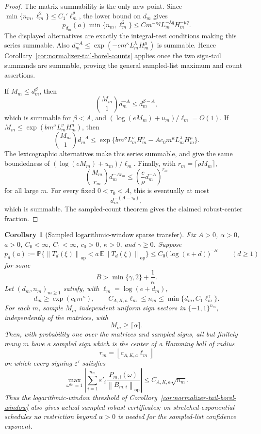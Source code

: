 \documentclass[11pt]{amsart}
\numberwithin{equation}{section}
\newtheorem{corollary}[theorem]{Corollary}
\theoremstyle{definition}
\theoremstyle{remark}
\newcommand{\op}{\mathrm{op}}
\newcommand{\Prob}{\mathbb P}
\newcommand{\Exp}{\mathbb E}
\newcommand{\norm}[1]{\left\lVert #1\right\rVert}
\newcommand{\eps}{\varepsilon}
\begin{document}
\begin{proof}
The matrix summability is the only new point.  Since
\(\min\{n_m,\ell_m^2\}\le C_1'\ell_m^\theta\), the lower bound on \(d_m\) gives
\[
  p_{d_m}(a)\min\{n_m,\ell_m^2\}
  \le C
  m^{-\kappa q}L_m^{-\lambda q}H_m^{-\mu q}.
\]
The displayed alternatives are exactly the integral-test conditions making this
series summable.  Also \(d_m^{-A}\le \exp(-c m^\kappa L_m^\lambda H_m^\mu)\) is
summable.  Hence Corollary~\ref{cor:normalizer-tail-borel-counts} applies once
the two sign-tail summands are summable, proving the general sampled-list
maximum and count assertions.

If \(M_m\le d_m^\beta\), then
\[
  \binom{M_m}{1}d_m^{-A}\le d_m^{\beta-A},
\]
which is summable for \(\beta<A\), and
\((\log(eM_m)+u_m)/\ell_m=O(1)\).  If
\(M_m\le\exp(bm^\sigma L_m^\nu H_m^\eta)\), then
\[
  \binom{M_m}{1}d_m^{-A}
  \le
  \exp\{bm^\sigma L_m^\nu H_m^\eta
        -Ac_0m^\kappa L_m^\lambda H_m^\mu\}.
\]
The lexicographic alternatives make this series summable, and give the same
boundedness of \((\log(eM_m)+u_m)/\ell_m\).  Finally, with
\(r_m=\lceil\rho M_m\rceil\),
\[
  \binom{M_m}{r_m}d_m^{-A r_m}
  \le
  \left(\frac{e}{\rho}d_m^{-A}\right)^{r_m}
\]
for all large \(m\).  For every fixed \(0<\tau_0<A\), this is eventually at most
\[
  d_m^{-(A-\tau_0)},
\]
which is summable.  The sampled-count theorem gives the claimed robust-center
fraction.
\end{proof}

\begin{corollary}[Sampled logarithmic-window sparse transfer]
\label{cor:normalizer-tail-borel-window-sampled}
Fix \(A>0\), \(\alpha>0\), \(a>0\), \(C_0<\infty\), \(C_1<\infty\),
\(c_0>0\), \(\kappa>0\), and \(\gamma\ge0\).  Suppose
\[
  p_d(a):=\Prob\{\norm{T_d(\xi)}_{\op}<a\,\Exp\norm{T_d(\xi)}_{\op}\}
  \le C_0\bigl(\log(e+d)\bigr)^{-B}
  \qquad(d\ge1)
\]
for some
\[
  B>\min\{\gamma,2\}+\frac1\kappa .
\]
Let \((d_m,n_m)_{m\ge1}\) satisfy, with \(\ell_m=\log(e+d_m)\),
\[
  d_m\ge\exp(c_0m^\kappa),\qquad
  C_{A,K,a}\ell_m\le n_m\le \min\{d_m,C_1\ell_m^\gamma\}.
\]
For each \(m\), sample \(M_m\) independent uniform sign vectors in
\(\{-1,1\}^{n_m}\), independently of the matrices, with
\[
  M_m\ge\lceil\alpha\rceil .
\]
Then, with probability one over the matrices and sampled signs, all but
finitely many \(m\) have a sampled sign which is the center of a Hamming ball of
radius
\[
  r_m=\left\lfloor c_{A,K,a}\ell_m\right\rfloor
\]
on which every signing \(\eps'\) satisfies
\[
  \max_{\omega^{d_m}=1}\left|\sum_{i=1}^{n_m}
  \eps'_i\frac{P_{m,i}(\omega)}{\norm{B_{m,i}}_{\op}}\right|
  \le C_{A,K,a}\sqrt{n_m}.
\]
Thus the logarithmic-window threshold of
Corollary~\ref{cor:normalizer-tail-borel-window} also gives actual sampled
robust certificates; on stretched-exponential schedules no restriction beyond
\(\alpha>0\) is needed for the sampled-list confidence exponent.
\end{corollary}
\end{document}
